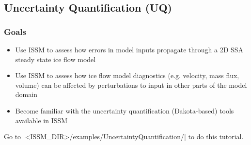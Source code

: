 
\subsection{Uncertainty Quantification (UQ)} \label{sec:using-issm-tutorials-uncertaintyquantification}
\subsubsection{Goals} %
\begin{itemize}
	\item Use ISSM to assess how errors in model inputs propagate through a 2D SSA steady state ice flow model
	\item Use ISSM to assess how ice flow model diagnostics (e.g. velocity, mass flux, volume) can be affected by perturbations to input in other parts of the model domain
	\item Become familiar with the uncertainty quantification (Dakota-based) tools available in ISSM
\end{itemize}

Go to \lstinlinebg|<ISSM_DIR>/examples/UncertaintyQuantification/| to do this tutorial.

